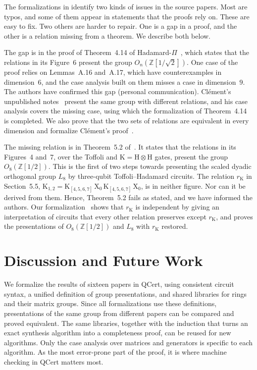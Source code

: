 \documentclass[acmsmall,nonacm,11pt,screen]{acmart}
\newcommand{\Z}{\mathbb{Z}}
\begin{document}
The formalizations in  identify two kinds of issues in the source papers. Most are typos, and some of them appear in statements that the proofs rely on. These are easy to fix. Two others are harder to repair. One is a gap in a proof, and the other is a relation missing from a theorem. We describe both below.

The gap is in the proof of Theorem~4.14 of Hadamard-$\Pi$~\cite{fang2026hadamard}, which states that the relations in its Figure~6 present the group $O_n\left(\Z\left[1/\sqrt2\right]\right)$. One case of the proof relies on Lemmas~A.16 and~A.17, which have counterexamples in dimension~$6$, and the case analysis built on them misses a case in dimension~$9$. The authors have confirmed this gap (personal communication). Cl\'ement's unpublished notes~\cite{clement2019thesis} present the same group with different relations, and his case analysis covers the missing case, using which the formalization of Theorem~4.14 is completed. We also prove that the two sets of relations are equivalent in every dimension and formalize Cl\'ement's proof~\cite{qcert2026clement}.

The missing relation is in Theorem~5.2 of~\cite{amy2024toffoli}. It states that the relations in its Figures~4 and~7, over the Toffoli and $\mathrm{K} = \mathrm{H}\otimes\mathrm{H}$ gates, present the group $O_8\left(\Z\left[1/2\right]\right)$. This is the first of two steps towards presenting the scaled dyadic orthogonal group $L_8$ by three-qubit Toffoli--Hadamard circuits. The relation $r_{\mathrm{K}}$ in Section~5.5, $\mathrm{K}_{1,2} = \mathrm{K}_{[4,5,6,7]}\,\mathrm{X}_0\,\mathrm{K}_{[4,5,6,7]}\,\mathrm{X}_0$, is in neither figure. Nor can it be derived from them. Hence, Theorem~5.2 fails as stated, and we have informed the authors. Our formalization~\cite{qcert2026toffoli} shows that $r_{\mathrm{K}}$ is independent by giving an interpretation of circuits that every other relation preserves except $r_{\mathrm{K}}$, and proves the presentations of $O_8\left(\Z\left[1/2\right]\right)$ and $L_8$ with $r_{\mathrm{K}}$ restored.

\section{Discussion and Future Work}\label{sec:conclusion}

We formalize the results of sixteen papers in QCert, using consistent circuit syntax, a unified definition of group presentations, and shared libraries for rings and their matrix groups. Since all formalizations use these definitions, presentations of the same group from different papers can be compared and proved equivalent. The same libraries, together with the induction that turns an exact synthesis algorithm into a completeness proof, can be reused for new algorithms. Only the case analysis over matrices and generators is specific to each algorithm. As the most error-prone part of the proof, it is where machine checking in QCert matters most.
\end{document}
